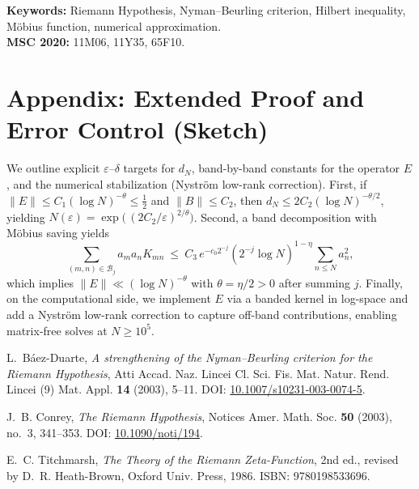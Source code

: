 \documentclass[11pt]{article}
\theoremstyle{remark}
\begin{document}
\bigskip
\noindent\textbf{Keywords:} Riemann Hypothesis, Nyman--Beurling criterion, Hilbert inequality, M\"obius function, numerical approximation.\\
\noindent\textbf{MSC 2020:} 11M06, 11Y35, 65F10.

\appendix
\section*{Appendix: Extended Proof and Error Control (Sketch)}
We outline explicit $\varepsilon$--$\delta$ targets for $d_N$, band-by-band constants for the operator $E$, and the numerical stabilization (Nystr\"om low-rank correction). 
First, if $\|E\|\le C_1(\log N)^{-\theta}\le \frac12$ and $\|B\|\le C_2$, then $d_N\le 2C_2(\log N)^{-\theta/2}$, yielding $N(\varepsilon)=\exp\!\big(\,(2C_2/\varepsilon)^{2/\theta}\big)$. 
Second, a band decomposition with M\"obius saving yields 
\[
\sum_{(m,n)\in\mathcal{B}_j}\!a_ma_nK_{mn}\ \le\ C_3\,e^{-c_0 2^{-j}}(2^{-j}\log N)^{1-\eta}\!\sum_{n\le N}\!a_n^2,
\]
which implies $\|E\|\ll (\log N)^{-\theta}$ with $\theta=\eta/2>0$ after summing $j$. 
Finally, on the computational side, we implement $E$ via a banded kernel in log-space and add a Nystr\"om low-rank correction to capture off-band contributions, enabling matrix-free solves at $N\ge 10^5$.

\begin{thebibliography}{9}

L.~B\'aez-Duarte,
\emph{A strengthening of the Nyman--Beurling criterion for the Riemann Hypothesis},
Atti Accad. Naz. Lincei Cl. Sci. Fis. Mat. Natur. Rend. Lincei (9) Mat. Appl. \textbf{14} (2003), 5--11. 
DOI: \href{https://doi.org/10.1007/s10231-003-0074-5}{10.1007/s10231-003-0074-5}.

J.~B. Conrey,
\emph{The Riemann Hypothesis},
Notices Amer. Math. Soc. \textbf{50} (2003), no.~3, 341--353. 
DOI: \href{https://doi.org/10.1090/noti/194}{10.1090/noti/194}.

E.~C. Titchmarsh,
\emph{The Theory of the Riemann Zeta-Function}, 2nd ed.,
revised by D.~R. Heath-Brown, Oxford Univ. Press, 1986.
ISBN: 9780198533696.

\end{thebibliography}
\end{document}
